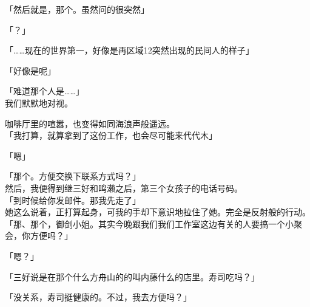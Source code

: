 「然后就是，那个。虽然问的很突然」

「？」

「……现在的世界第一，好像是再区域12突然出现的民间人的样子」

「好像是呢」

「难道那个人是……」\\

我们默默地对视。

咖啡厅里的喧嚣，也变得如同海浪声般遥远。\\

「我打算，就算拿到了这份工作，也会尽可能来代代木」

「嗯」

「那个。方便交换下联系方式吗？」\\

然后，我便得到继三好和鸣濑之后，第三个女孩子的电话号码。\\

「到时候给你发邮件。那我先走了」\\

她这么说着，正打算起身，可我的手却下意识地拉住了她。完全是反射般的行动。\\

「那、那个，御剑小姐。其实今晚跟我们我们工作室这边有关的人要搞一个小聚会，你方便吗？」

「嗯？」

「三好说是在那个什么方舟山的的叫内藤什么的店里。寿司吃吗？」

「没关系，寿司挺健康的。不过，我去方便吗？」


